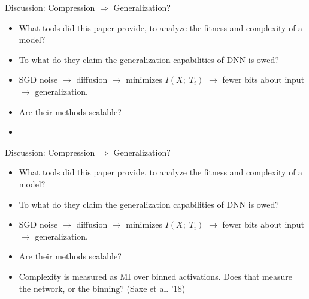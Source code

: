 \begin{frame}{Discussion: Compression $\Rightarrow$ Generalization?}

\begin{itemize}
    \item What tools did this paper provide, to analyze the fitness and complexity of a model?
    \item To what do they claim the generalization capabilities of DNN is owed?
    \item SGD noise $\rightarrow$ diffusion $\rightarrow$ minimizes $I(X;\;T_i)$ $\rightarrow$ fewer bits about input $\rightarrow$ generalization.
    \item Are their methods scalable?
    \item[-] 
\end{itemize}

\end{frame}

\begin{frame}{Discussion: Compression $\Rightarrow$ Generalization?}

\begin{itemize}
    \item What tools did this paper provide, to analyze the fitness and complexity of a model?
    \item To what do they claim the generalization capabilities of DNN is owed?
    \item SGD noise $\rightarrow$ diffusion $\rightarrow$ minimizes $I(X;\;T_i)$ $\rightarrow$ fewer bits about input $\rightarrow$ generalization.
    \item Are their methods scalable?
    \item Complexity is measured as MI over binned activations. Does that measure the network, or the binning? (Saxe et al. '18)
\end{itemize}

\end{frame}

